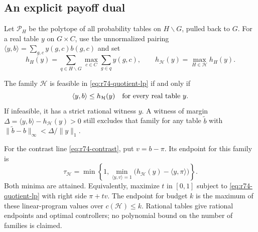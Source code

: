 \subsection{An explicit payoff dual}
Let $\mathcal P_H$ be the polytope of all probability tables on
$H\backslash G$, pulled back to $G$. For a real table $y$ on $G\times C$,
use the unnormalized pairing $\langle y,b\rangle=\sum_{g,c}y(g,c)b(g,c)$
and set
\begin{equation}\label{eq:r74-dual-support}
 h_H(y)=\sum_{q\in H\backslash G}\max_{c\in C}\sum_{g\in q}y(g,c),
 \qquad h_{\mathcal H}(y)=\max_{H\in\mathcal H}h_H(y).
\end{equation}

\begin{theorem}
\label{thm:r74-quotient-dual}
The family $\mathcal H$ is feasible in \eqref{eq:r74-quotient-lp} if and
only if
\begin{equation}\label{eq:r74-payoff-test}
 \langle y,b\rangle\le h_{\mathcal H}(y)
 \quad\hbox{for every real table }y.
\end{equation}
If infeasible, it has a strict rational witness $y$. A witness of margin
$\Delta=\langle y,b\rangle-h_{\mathcal H}(y)>0$ still excludes that family
for any table $\widetilde b$ with
$\|\widetilde b-b\|_\infty<\Delta/\|y\|_1$.

For the contrast line \eqref{eq:r74-contrast}, put $v=b-\pi$. Its endpoint
for this family is
\begin{equation}\label{eq:r74-threshold-dual}
 \tau_{\mathcal H}
 =\min\left\{1,
  \min_{\langle y,v\rangle=1}
       \bigl(h_{\mathcal H}(y)-\langle y,\pi\rangle\bigr)\right\}.
\end{equation}
Both minima are attained. Equivalently, maximize $t$ in $[0,1]$ subject to
\eqref{eq:r74-quotient-lp} with right side $\pi+tv$.
The endpoint for budget $k$ is the maximum of these linear-program values
over $c(\mathcal H)\le k$. Rational tables give rational endpoints and
optimal controllers; no polynomial bound on the number of families is claimed.
\end{theorem}
